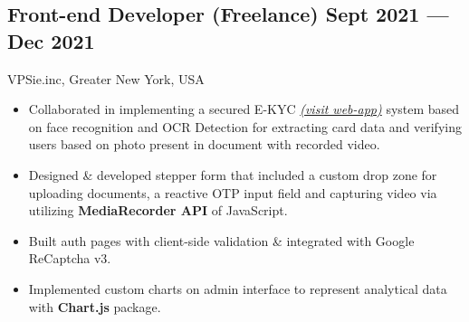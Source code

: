 \documentclass[a4,10pt]{article}
\newcommand{\subtext}[1]{
#1\par\vspace{-0.2cm}}
\newenvironment{zitemize}{
\begin{itemize}\itemsep0pt \parskip0pt \parsep1pt}
{\end{itemize}\vspace{-0.5cm}}
\begin{document}
        

\subsection*{Front-end Developer {\normalsize\normalfont (Freelance)} \hfill Sept 2021 --- Dec 2021} 
\subtext{VPSie.inc, Greater New York, USA} 
    \begin{zitemize}
        \item Collaborated in implementing a secured E-KYC \href{https://kyc.itpay.io/info/}{\normalsize\normalfont \textit{(visit web-app)}} system based on face recognition and OCR Detection for extracting card data and verifying users based on photo present in document with recorded video.
        \item Designed \& developed stepper form that included a custom drop zone for uploading documents, a reactive OTP input field and capturing video via utilizing \textbf{MediaRecorder API} of JavaScript.
        \item Built auth pages with client-side validation \& integrated with Google ReCaptcha v3.
        \item Implemented custom charts on admin interface to represent analytical data with \textbf{Chart.js} package.
    \end{zitemize}


\end{document}
